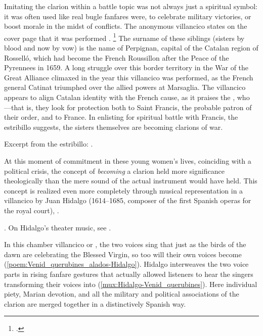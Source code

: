 Imitating the clarion within a battle topic was not always just a spiritual
symbol: it was often used like real bugle fanfares were, to celebrate military
victories, or boost morale in the midst of conflicts.
The anonymous villancico  states on the cover
page that it was performed .%
    \footnote{.}
The surname of these siblings (sisters by blood and now by vow) is the name of
Perpignan, capital of the Catalan region of Rosselló, which had become the
French Roussillon after the Peace of the Pyrennees in 1659.
A long struggle over this border territory in the War of the Great Alliance
climaxed in the year this villancico was performed, as the French general
Catinat triumphed over the allied powers at Marsaglia.
The villancico appears to align Catalan identity with the French cause, as it
praises the , who
---that is,
they look for protection both to Saint Francis, the probable patron of their
order, and to France.
In enlisting for spiritual battle with Francis, the estribillo suggests, the
sisters themselves are becoming clarions of war.%
\begin{Footnote}
    Excerpt from the estribillo: 
    .
\end{Footnote}

At this moment of commitment in these young women's lives, coinciding with a
political crisis, the concept of \emph{becoming} a clarion held more
significance theologically than the mere sound of the actual instrument would
have held.
This concept is realized even more completely through musical representation in
a villancico by Juan Hidalgo (1614--1685, composer of the first Spanish operas
for the royal court), .%
\begin{Footnote}
    . 
    On Hidalgo's theater music, see \autocite{Stein:Songs}.
\end{Footnote}
In this chamber villancico or , the two voices sing that just
as the birds of the dawn are  celebrating the Blessed Virgin, so
too will their own voices become 
(\cref{poem:Venid_querubines_alados-Hidalgo}).
Hidalgo interweaves the two voice parts in rising fanfare gestures that
actually allowed listeners to hear the singers transforming their voices into
 (\cref{mux:Hidalgo-Venid_querubines}).
Here individual piety, Marian devotion, and all the military and political
associations of the clarion are merged together in a distinctively Spanish way.


